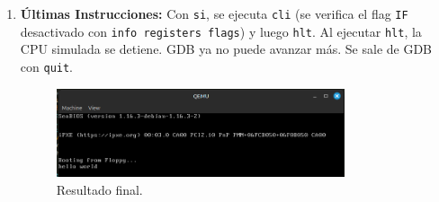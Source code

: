\begin{enumerate}[noitemsep]
    \item \textbf{Últimas Instrucciones:} Con \texttt{si}, se ejecuta \texttt{cli} (se verifica el flag \texttt{IF} desactivado con \texttt{info registers flags}) y luego \texttt{hlt}. Al ejecutar \texttt{hlt}, la CPU simulada se detiene. GDB ya no puede avanzar más. Se sale de GDB con \texttt{quit}.
    \begin{figure}[H]
        \centering
        \includegraphics[width=0.8\textwidth]{images/resultado.png}
        \caption{Resultado final.}
    \end{figure}
\end{enumerate}

